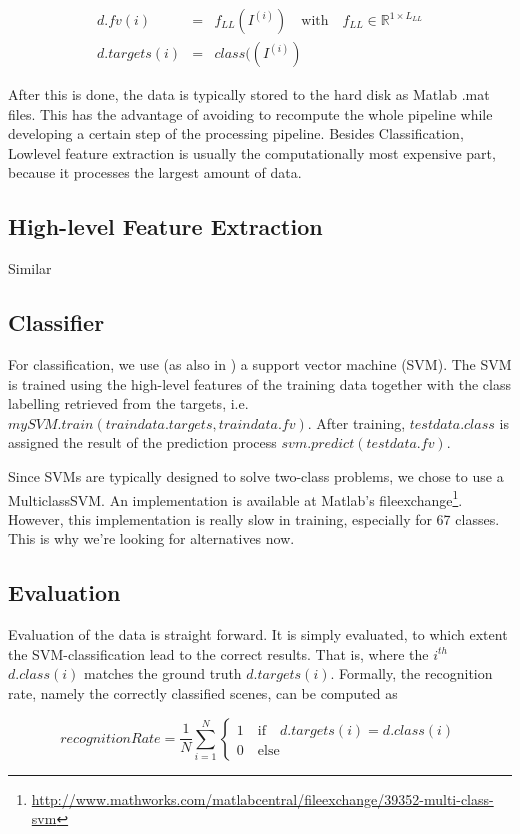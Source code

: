 \documentclass[10pt,twocolumn,letterpaper]{article}
\begin{document}
\begin{small}

\begin{eqnarray}
d.fv(i) & = & f_{LL}(I^{(i)}) \quad \text{with} \quad f_{LL} \in \mathbb{R}^{1 \times L_{LL}} \\
d.targets(i)& = &class((I^{(i)})
\end{eqnarray}  

\end{small}

After this is done, the data is typically stored to the hard disk as Matlab .mat files. This has the advantage of avoiding to recompute the whole pipeline while developing a certain step of the processing pipeline. Besides Classification, Lowlevel feature extraction is usually the computationally most expensive part, because it processes the largest amount of data.
\subsection{High-level Feature Extraction}

Similar

\subsection{Classifier}
For classification, we use (as also in \cite{indoorScenes}) a support vector machine (SVM). The SVM is trained using the high-level features of the training data together with the class labelling retrieved from the targets, i.e. $mySVM.train(traindata.targets, traindata.fv)$. After training, $testdata.class$ is assigned the result of the prediction process $svm.predict(testdata.fv)$. 

Since SVMs are typically designed to solve two-class problems, we chose to use a MulticlassSVM. An implementation is available at Matlab's fileexchange\footnote{\url{http://www.mathworks.com/matlabcentral/fileexchange/39352-multi-class-svm}}. However, this implementation is really slow in training, especially for 67 classes. This is why we're looking for alternatives now.

\subsection{Evaluation}
\label{sec:eval}
Evaluation of the data is straight forward. It is simply evaluated, to which extent the SVM-classification lead to the correct results. That is, where the $i^{th}$ $d.class(i)$ matches the ground truth $d.targets(i)$. Formally, the recognition rate, namely the correctly classified scenes, can be computed as 
\begin{small}

\begin{equation}
	recognitionRate = \frac{1}{N} \sum_{i=1}^{N} \begin{cases}
	1 \quad \text{if} \quad d.targets(i) = d.class(i)\\
	0  \quad \text{else}
	\end{cases}
\end{equation}
\end{small}
\end{document}
